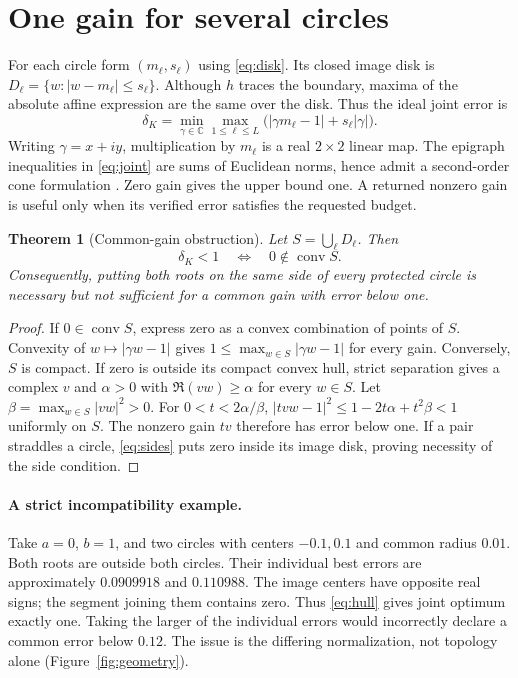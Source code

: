 \documentclass[11pt]{article}
\newtheorem{theorem}{Theorem}[section]
\theoremstyle{definition}\newtheorem{definition}[theorem]{Definition}
\newcommand{\C}{\mathbb C}\newcommand{\R}{\mathbb R}\newcommand{\eps}{\varepsilon}
\DeclareMathOperator{\conv}{conv}\DeclareMathOperator{\wind}{wind}
\begin{document}
\section{One gain for several circles}
For each circle form $(m_\ell,s_\ell)$ using \eqref{eq:disk}. Its closed image disk is $D_\ell=\{w:|w-m_\ell|\le s_\ell\}$. Although $h$ traces the boundary, maxima of the absolute affine expression are the same over the disk. Thus the ideal joint error is
\begin{equation}
 \delta_K=\min_{\gamma\in\C}\max_{1\le\ell\le L}
       \bigl(|\gamma m_\ell-1|+s_\ell|\gamma|\bigr).\label{eq:joint}
\end{equation}
Writing $\gamma=x+iy$, multiplication by $m_\ell$ is a real $2\times2$ linear map. The epigraph inequalities in \eqref{eq:joint} are sums of Euclidean norms, hence admit a second-order cone formulation \cite{boyd}. Zero gain gives the upper bound one. A returned nonzero gain is useful only when its verified error satisfies the requested budget.

\begin{theorem}[Common-gain obstruction]\label{thm:hull}
Let $S=\bigcup_\ell D_\ell$. Then
\begin{equation}
 \delta_K<1\quad\Longleftrightarrow\quad 0\notin\conv S.\label{eq:hull}
\end{equation}
Consequently, putting both roots on the same side of every protected circle is necessary but not sufficient for a common gain with error below one.
\end{theorem}
\begin{proof}
If $0\in\conv S$, express zero as a convex combination of points of $S$. Convexity of $w\mapsto|\gamma w-1|$ gives $1\le\max_{w\in S}|\gamma w-1|$ for every gain.
Conversely, $S$ is compact. If zero is outside its compact convex hull, strict separation gives a complex $v$ and $\alpha>0$ with $\Re(vw)\ge\alpha$ for every $w\in S$. Let $\beta=\max_{w\in S}|vw|^2>0$. For $0<t<2\alpha/\beta$,
$|tvw-1|^2\le1-2t\alpha+t^2\beta<1$ uniformly on $S$. The nonzero gain $tv$ therefore has error below one. If a pair straddles a circle, \eqref{eq:sides} puts zero inside its image disk, proving necessity of the side condition.
\end{proof}

\paragraph{A strict incompatibility example.}
Take $a=0$, $b=1$, and two circles with centers $-0.1,0.1$ and common radius $0.01$. Both roots are outside both circles. Their individual best errors are approximately $0.0909918$ and $0.110988$. The image centers have opposite real signs; the segment joining them contains zero. Thus \eqref{eq:hull} gives joint optimum exactly one. Taking the larger of the individual errors would incorrectly declare a common error below $0.12$. The issue is the differing normalization, not topology alone (Figure~\ref{fig:geometry}).
\end{document}

